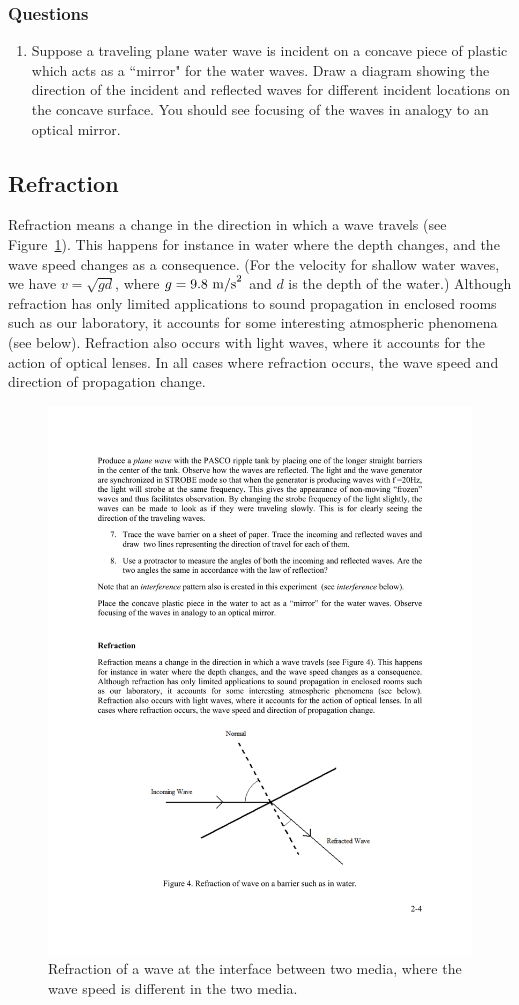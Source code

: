 \documentclass[11pt]{NSF}
\def\ben{\begin{enumerate}}
\def\een{\end{enumerate}}
\def\i{\item{}}
\begin{document}
\subsubsection*{Questions}
\ben
\i Suppose a traveling plane water wave is incident 
on a concave piece of plastic which acts as a 
``mirror" for the water waves.
Draw a diagram showing the direction of the incident and 
reflected waves for different incident locations on the concave surface.
You should see focusing of the waves in analogy to
an optical mirror.

\een

\subsection{Refraction}

Refraction means a change in the direction in which a wave travels 
(see Figure~\ref{f:4}). 
This happens for instance in water where the depth changes, and the wave
speed changes as a consequence. 
(For the velocity for shallow water waves, we have 
$v = \sqrt{gd}$, where $g = 9.8~{\rm m/s}^2$ and $d$ is
the depth of the water.)
Although refraction has only limited
applications to sound propagation in enclosed rooms such as our laboratory, it
accounts for some interesting atmospheric phenomena (see below). Refraction
also occurs with light waves, where it accounts for the action of optical
lenses. In all cases where refraction occurs, the wave speed and direction of
propagation change.
%
\begin{figure}[hbtp]
\begin{center}
\includegraphics[width=.6\textwidth]{fig2_4}
\caption{Refraction of a wave at the interface between two media, where 
the wave speed is different in the two media.}
\label{f:4}
\end{center}
\end{figure}
%
\end{document}
